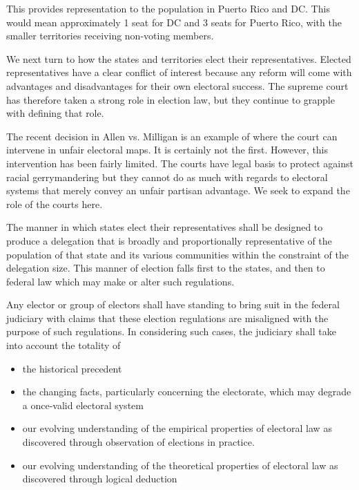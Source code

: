 \documentclass{article}
\begin{document}
This provides representation to the population in Puerto Rico and DC. This would mean approximately 1 seat for DC and 3 seats for Puerto Rico, with the smaller territories receiving non-voting members.

We next turn to how the states and territories elect their representatives. Elected representatives have a clear conflict of interest because any reform will come with advantages and disadvantages for their own electoral success. The supreme court has therefore taken a strong role in election law, but they continue to grapple with defining that role.

The recent decision in Allen vs. Milligan is an example of where the court can intervene in unfair electoral maps. It is certainly not the first. However, this intervention has been fairly limited\cite{Brewer}. The courts have legal basis to protect against racial gerrymandering but they cannot do as much with regards to electoral systems that merely convey an unfair partisan advantage. We seek to expand the role of the courts here.

\begin{quoting}
The manner in which states elect their representatives shall be designed to produce a delegation that is broadly and proportionally representative of the population of that state and its various communities within the constraint of the delegation size. This manner of election falls first to the states, and then to federal law which may make or alter such regulations.

Any elector or group of electors shall have standing to bring suit in the federal judiciary with claims that these election regulations are misaligned with the purpose of such regulations. In considering such cases, the judiciary shall take into account the totality of
\begin{itemize}
\item the historical precedent
\item the changing facts, particularly concerning the electorate, which may degrade a once-valid electoral system
\item our evolving understanding of the empirical properties of electoral law as discovered through observation of elections in practice.
\item our evolving understanding of the theoretical properties of electoral law as discovered through logical deduction
\end{itemize}
\end{quoting}
\end{document}

